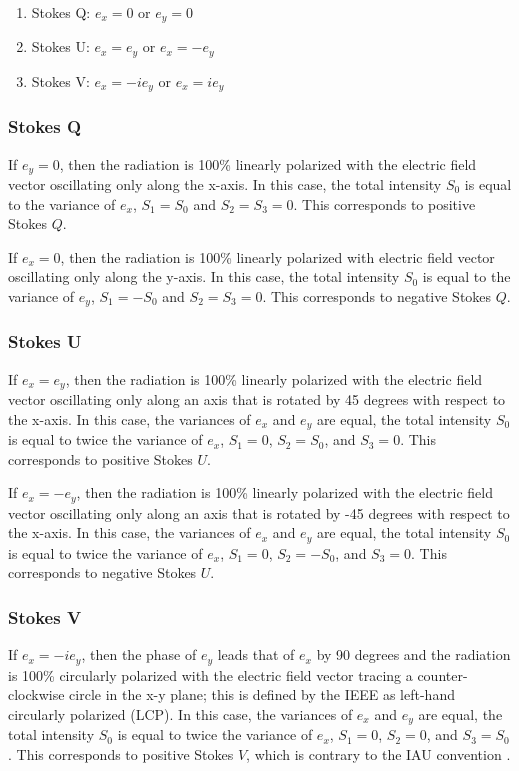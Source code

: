 \documentclass[twocolumn]{aastex6}
\begin{document}
\begin{enumerate}
\item Stokes Q: $e_x=0$ or $e_y=0$
\item Stokes U: $e_x=e_y$ or $e_x=-e_y$
\item Stokes V: $e_x=-i e_y$ or $e_x=i e_y$
\end{enumerate}

\subsubsection {Stokes Q}

If $e_y=0$, then the radiation is 100\% linearly polarized with
the electric field vector oscillating only along the x-axis.  In this
case, the total intensity $S_0$ is equal to the variance of $e_x$,
$S_1=S_0$ and $S_2=S_3=0$.  This corresponds to positive Stokes $Q$.

If $e_x=0$, then the radiation is 100\% linearly polarized with
electric field vector oscillating only along the y-axis.  In this
case, the total intensity $S_0$ is equal to the variance of $e_y$,
$S_1=-S_0$ and $S_2=S_3=0$.  This corresponds to negative Stokes $Q$.

\subsubsection {Stokes U}

If $e_x=e_y$, then the radiation is 100\% linearly polarized with
the electric field vector oscillating only along an axis that is rotated
by 45 degrees with respect to the x-axis.  In this case, the variances
of $e_x$ and $e_y$ are equal, the total intensity $S_0$ is equal to
twice the variance of $e_x$, $S_1=0$, $S_2=S_0$, and $S_3=0$.  This
corresponds to positive Stokes $U$.

If $e_x=-e_y$, then the radiation is 100\% linearly polarized with
the electric field vector oscillating only along an axis that is rotated
by -45 degrees with respect to the x-axis.  In this case, the variances
of $e_x$ and $e_y$ are equal, the total intensity $S_0$ is equal to
twice the variance of $e_x$, $S_1=0$, $S_2=-S_0$, and $S_3=0$.  This
corresponds to negative Stokes $U$.

\subsubsection {Stokes V}

If $e_x=-i e_y$, then the phase of $e_y$ leads that of $e_x$ by 90
degrees and the radiation is 100\% circularly polarized with the electric
field vector tracing a counter-clockwise circle in the x-y plane; this
is defined by the IEEE as left-hand circularly polarized (LCP).  In
this case, the variances of $e_x$ and $e_y$ are equal, the total
intensity $S_0$ is equal to twice the variance of $e_x$, $S_1=0$,
$S_2=0$, and $S_3=S_0$.  This corresponds to positive Stokes $V$,
which is contrary to the IAU convention \citep[see][for more
  details]{vmjr10}.
\end{document}
